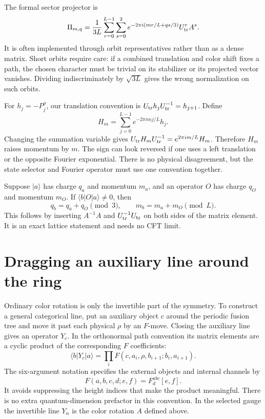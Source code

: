 The formal sector projector is
\[
 \Pi_{m,q}=\frac1{3L}\sum_{r=0}^{L-1}\sum_{s=0}^2
       e^{-2\pi i(mr/L+qs/3)}U_{\rm tr}^rA^s.
\]
It is often implemented through orbit representatives rather than as a
dense matrix. Short orbits require care: if a combined translation and
color shift fixes a path, the chosen character must be trivial on its
stabilizer or its projected vector vanishes. Dividing indiscriminately by
$\sqrt{3L}$ gives the wrong normalization on such orbits.

For $h_j=-P_j^\rho$, our translation convention is
$U_{\rm tr}h_jU_{\rm tr}^{-1}=h_{j+1}$. Define
\begin{equation}
 H_m=\sum_{j=0}^{L-1}e^{-2\pi imj/L}h_j.
 \label{eq:energy-Fourier}
\end{equation}
Changing the summation variable gives
$U_{\rm tr}H_mU_{\rm tr}^{-1}=e^{2\pi im/L}H_m$.
Therefore $H_m$ raises momentum by $m$.
The sign can look reversed if one uses a left translation or the opposite
Fourier exponential. There is no physical disagreement, but the state
selector and Fourier operator must use one convention together.

\begin{example}
Suppose $|a\rangle$ has charge $q_a$ and momentum $m_a$, and an operator
$O$ has charge $q_O$ and momentum $m_O$. If
$\langle b|O|a\rangle\ne0$, then
\[
 q_b=q_a+q_O\pmod3,\qquad m_b=m_a+m_O\pmod L.
\]
This follows by inserting $A^{-1}A$ and $U_{\rm tr}^{-1}U_{\rm tr}$ on both sides of the
matrix element. It is an exact lattice statement and needs no CFT limit.
\end{example}

\section{Dragging an auxiliary line around the ring}

Ordinary color rotation is only the invertible part of the symmetry. To
construct a general categorical line, put an auxiliary object $c$ around
the periodic fusion tree and move it past each physical $\rho$ by an
$F$-move. Closing the auxiliary line gives an operator $Y_c$. In the
orthonormal path convention its matrix elements are a cyclic product of
the corresponding $F$ coefficients:
\begin{equation}
 \langle b|Y_c|a\rangle
 =\prod_i F(c,a_i,\rho,b_{i+1};b_i,a_{i+1}).
 \label{eq:topological-line-product}
\end{equation}
The six-argument notation specifies the external objects and internal
channels by
\[
 F(a,b,c,d;e,f)=F^{abc}_d[e,f].
\]
It avoids suppressing the height indices that
make the product meaningful. There is no extra quantum-dimension
prefactor in this convention.
In the selected gauge the invertible line $Y_\alpha$ is the color
rotation $A$ defined above.

